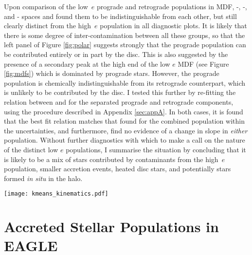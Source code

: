 Upon comparison of the low~$e$ prograde and retrograde populations in MDF,
\mgfe{}-\feh{}, \alfe{}-\feh{}, and \nife{}-\feh{} spaces and found them to be indistinguishable from each other, but still clearly
distinct from the high~$e$ population in all diagnostic plots.  It
is likely that there is some degree of inter-contamination between
all these groups, so that the left panel of Figure \ref{fig:polar}
suggests strongly that the prograde population can be contributed
entirely or in part by the disc.  This is also suggested by the
presence of a secondary peak at the high \feh{} end of the low $e$
MDF (see Figure \ref{fig:mdfs}) which is dominated by prograde
stars.  However, the prograde population is
chemically indistinguishable from its retrograde counterpart, which
is unlikely to be contributed by the disc.  I tested this further
by re-fitting the relation between \mgfe{} and \feh{} for the
separated prograde and retrograde components, using the procedure
described in Appendix \ref{sec:appA}. In both cases, it is found that
the best fit relation matches that found for the combined population
within the uncertainties, and furthermore, find no evidence of a
change in slope in \emph{either} population.  Without further diagnostics
with which to make a call on the nature of the distinct low $e$
populations, I summarise the situation by concluding that it is
likely to be a mix of stars contributed by contaminants
from the high~$e$ population, smaller accretion events, heated
disc stars, and potentially stars formed {\it in situ} in the halo.

\begin{figure*} \texttt{[image: kmeans\_kinematics.pdf]}
\caption[The distribution of disc and accreted halo
populations in spherical polar coordinate planes, coloured by membership in the low and high $e$ groups]{\label{fig:polar} Distribution of disc and accreted halo
populations in spherical polar coordinate planes.  On the left
panel, the high $e$ population occupies the same locus in $v_R-v_\phi$
space (left panel) as the population identified by
\citet{2018MNRAS.478..611B}.  The low $e$ population splits into
two populations according to $v_\phi$, with one prograde and one
retrograde component, suggesting that this population may in fact
be from a mix of disc contaminants and debris from smaller satellites.
} \end{figure*}


\section{Accreted Stellar Populations in EAGLE} \label{eagle}

